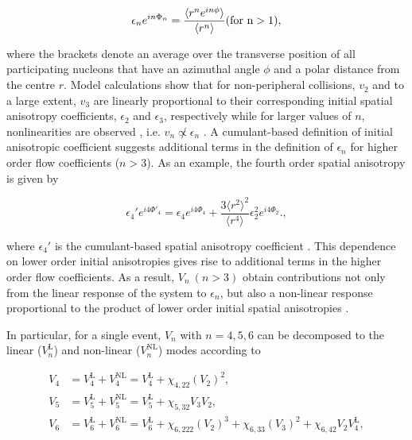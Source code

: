 \begin{equation}
\epsilon_{n}e^{in\Phi_n} = \frac{\langle{r^{n}e^{in\phi}}\rangle}{\langle r^n\rangle}  (\rm{for}~n>1),
\label{Eq:epsilonn}
\end{equation}

where the brackets denote an average over the transverse position of all participating nucleons that have an azimuthal angle $\phi$ and a polar distance from the centre $r$. Model calculations show that for non-peripheral collisions, $v_2$ and to a large extent, $v_3$ are linearly proportional to their corresponding initial spatial anisotropy coefficients, $\epsilon_{2}$ and $\epsilon_{3}$, respectively \cite{Alver:2010gr} while for larger values of $n$, nonlinearities are observed , i.e. $v_{n} \not\propto \epsilon_{n}$ \cite{Alver:2010dn}.
A cumulant-based definition of initial anisotropic coefficient suggests additional terms in the definition of $\epsilon_{n}$ for higher order flow coefficients ($n>3$). As an example, the fourth order spatial anisotropy is given by 
 
\begin{equation}
\epsilon_{4}'e^{i4\Phi'_4} = \epsilon_{4}e^{i4\Phi_4}  + \frac{3\langle{r^{2}}\rangle^{2}}{\langle r^4\rangle}\epsilon_{2}^{2}e^{i4\Phi_2}.,
\label{Eq:epsilonnprime}
\end{equation}

where $\epsilon_{4}'$ is the cumulant-based spatial anisotropy coefficient \cite{Teaney:2013dta,Qian:2017ier}. This dependence on lower order initial anisotropies gives rise to additional terms in the higher order flow coefficients. As a result, $V_n~(n > 3)$ obtain contributions not only from the linear response of the system to $\epsilon_{n}$, but also a non-linear response proportional to the product of lower order initial spatial anisotropies \cite{Bhalerao:2014xra,Yan:2015jma}. 

In particular, for a single event, $V_n$ with $n=4,5,6$ can be decomposed to the linear ($V_{n}^{\mathrm{L}} $) and non-linear ($ V_{n}^{\mathrm{NL}}$) modes according to%

\vspace{-0.55cm}
\begin{align}
V_{4} &= V_{4}^{\mathrm{L}} + V_{4}^{\mathrm{NL}} = V_{4}^{\mathrm{L}} + \chi_{4,22}(V_{2})^2, \nonumber \\
V_{5} &= V_{5}^{\mathrm{L}} + V_{5}^{\mathrm{NL}} = V_{5}^{\mathrm{L}} + \chi_{5,32}V_{3}V_{2}, \nonumber \\
V_{6} &= V_{6}^{\mathrm{L}} + V_{6}^{\mathrm{NL}} = V_{6}^{\mathrm{L}} + \chi_{6,222}(V_{2})^3 + \chi_{6,33}(V_{3})^2 + \chi_{6,42}V_{2}V_{4}^{\mathrm{L}},
\label{Eq:V4V5V6}
\end{align}
\vspace{-0.55cm}

